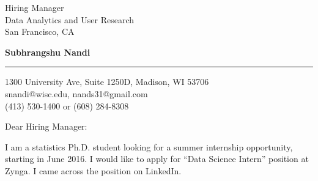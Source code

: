 \documentclass{letter} %
\begin{document}
\signature{Subhrangshu Nandi}           %
\longindentation=0pt                       %
\let\raggedleft\raggedright                %
 
 
\begin{letter}
{Hiring Manager \\
Data Analytics and User Research \\
San Francisco, CA
}


\begin{flushleft}
{\bf Subhrangshu Nandi}
\end{flushleft}
\medskip\hrule height 1pt
\begin{flushright}
\hfill 1300 University Ave, Suite 1250D, Madison, WI 53706 \\
\hfill snandi@wisc.edu, nands31@gmail.com\\
\hfill (413) 530-1400 or (608) 284-8308
\end{flushright} 
\vfill %

\opening{Dear Hiring Manager:} 
 
\noindent %
I am a statistics Ph.D. student looking for a summer internship opportunity, starting in June 2016. I would like to apply for ``Data Science Intern'' position at Zynga. I came across the position on LinkedIn.
 

\end{letter}
\end{document}
